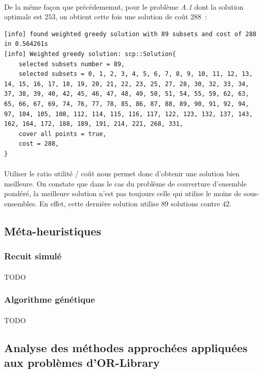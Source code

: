 \documentclass[12pt,letterpaper,twoside]{article}
\begin{document}
			\paragraph*{}
				De la même façon que précédememnt, pour le problème \emph{A.1} dont la solution optimale est \(253\), on obtient cette fois
				une solution de coût \(288\) :
			\begin{lstlisting}
[info] found weighted greedy solution with 89 subsets and cost of 288 in 0.564261s
[info] Weighted greedy solution: scp::Solution{
	selected subsets number = 89,
	selected subsets = 0, 1, 2, 3, 4, 5, 6, 7, 8, 9, 10, 11, 12, 13, 14, 15, 16, 17, 18, 19, 20, 21, 22, 23, 25, 27, 28, 30, 32, 33, 34, 37, 38, 39, 40, 42, 45, 46, 47, 48, 49, 50, 51, 54, 55, 59, 62, 63, 65, 66, 67, 69, 74, 76, 77, 78, 85, 86, 87, 88, 89, 90, 91, 92, 94, 97, 104, 105, 108, 112, 114, 115, 116, 117, 122, 123, 132, 137, 143, 162, 164, 172, 188, 189, 191, 214, 221, 268, 331,
	cover all points = true,
	cost = 288,
}\end{lstlisting}
			\paragraph*{}
				Utiliser le ratio utilité / coût nous permet donc d'obtenir une solution bien meilleure. On constate que dans le cas du
				problème de couverture d'ensemble pondéré, la meilleure solution n'est pas toujours celle qui utilise le moins de
				sous-ensembles. En effet, cette dernière solution utilise \(89\) solutions contre \(42\).
		\subsection{Méta-heuristiques}
			\subsubsection{Recuit simulé}
				\paragraph*{}
					TODO
			\subsubsection{Algorithme génétique}
				\paragraph*{}
					TODO
		\subsection{Analyse des méthodes approchées appliquées aux problèmes d'OR-Library}
\end{document}
